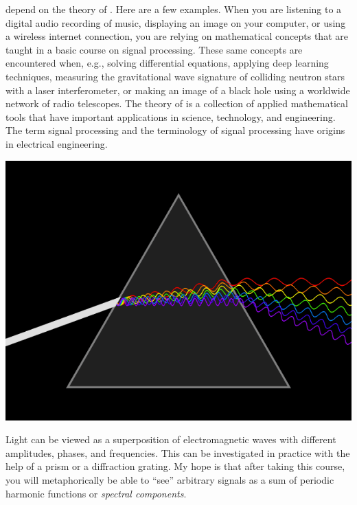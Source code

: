 depend on the theory of . Here are a few examples. When you are listening to a digital audio recording of music, displaying an image on your computer, or using a wireless internet connection, you are relying on mathematical concepts that are taught in a basic course on signal processing. These same concepts are encountered when, e.g., solving differential equations, applying deep learning techniques, measuring the gravitational wave signature of colliding neutron stars with a laser interferometer, or making an image of a black hole using a worldwide network of radio telescopes. The theory of \emph{} is a collection of applied mathematical tools that have important applications in science, technology, and engineering. The term signal processing and the terminology of signal processing have origins in electrical engineering.

\begin{marginfigure}[-4.2cm]
\begin{center}
\includegraphics[width=\textwidth]{ch01/figures/prism.png}
\end{center}
\caption{Light can be viewed as a superposition of electromagnetic waves
with different amplitudes, phases, and frequencies. This can be
investigated in practice with the help of a prism or a diffraction
grating. My hope is that after taking this course, you will
metaphorically be able to ``see'' arbitrary signals as a sum of
periodic harmonic functions or \emph{spectral components}.}
\label{fig:prism}
\end{marginfigure}

